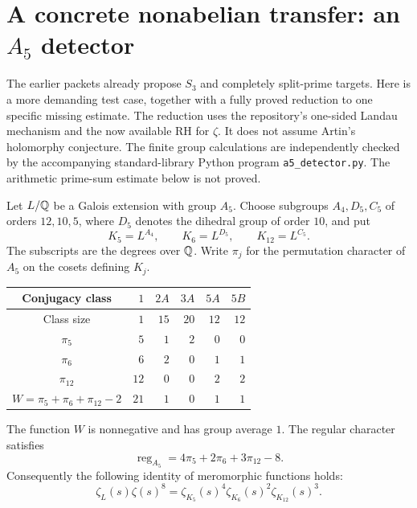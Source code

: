 \section{A concrete nonabelian transfer: an \texorpdfstring{$A_5$}{A5} detector}
\label{sec:a5-transfer}

The earlier packets already propose $S_3$ and completely split-prime targets.
Here is a more demanding test case, together with a fully proved reduction to
one specific missing estimate.  The reduction uses the repository's one-sided
Landau mechanism and the now available RH for $\zeta$.  It does not assume
Artin's holomorphy conjecture.  The finite group calculations are independently
checked by the accompanying standard-library Python program
\texttt{a5\_detector.py}.  The arithmetic prime-sum estimate below is not proved.

Let $L/\mathbb Q$ be a Galois extension with group $A_5$.  Choose subgroups
$A_4,D_5,C_5$ of orders $12,10,5$, where $D_5$ denotes the dihedral group of
order $10$, and put
\[
 K_5=L^{A_4},\qquad K_6=L^{D_5},\qquad K_{12}=L^{C_5}.
\]
The subscripts are the degrees over $\mathbb Q$.  Write $\pi_j$ for the permutation
character of $A_5$ on the cosets defining $K_j$.

\begin{center}
\begin{tabular}{c|rrrrr}
Conjugacy class&$1$&$2A$&$3A$&$5A$&$5B$\\\hline
Class size&$1$&$15$&$20$&$12$&$12$\\
$\pi_5$&$5$&$1$&$2$&$0$&$0$\\
$\pi_6$&$6$&$2$&$0$&$1$&$1$\\
$\pi_{12}$&$12$&$0$&$0$&$2$&$2$\\\hline
$W=\pi_5+\pi_6+\pi_{12}-2$&$21$&$1$&$0$&$1$&$1$
\end{tabular}
\end{center}

\begin{lemma}
\label{lem:a5-identities}
The function $W$ is nonnegative and has group average $1$.  The regular
character satisfies
\[
 \operatorname{reg}_{A_5}=4\pi_5+2\pi_6+3\pi_{12}-8.
\]
Consequently the following identity of meromorphic functions holds:
\begin{equation}
 \zeta_L(s)\zeta(s)^8
 =\zeta_{K_5}(s)^4\zeta_{K_6}(s)^2\zeta_{K_{12}}(s)^3.
 \label{eq:a5-zeta-identity}
\end{equation}
\end{lemma}


